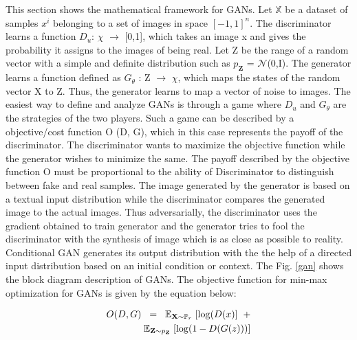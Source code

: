 \documentclass[conference]{IEEEtran}
\begin{document}
	This section shows the mathematical framework for GANs. Let $\mathbb{X}$ be a dataset of samples $x^{i}$ belonging to a set of images in space $[-1,1]^n$. The discriminator learns a function $D_u$: $\chi$ $\rightarrow$ [0,1], which takes an image x and gives the probability it assigns to the images of being real. Let Z be the range of a random vector with a simple and definite distribution such as $p_\textbf{Z}$ = $\mathcal{N}$(0,I). The generator learns a function defined as $G_\theta$ : Z $\rightarrow$ $\chi$, which maps the states of the random vector X to Z. Thus, the generator learns to map a vector of noise to images. The easiest way to define and analyze GANs is through a game where $D_u$ and $G_\theta$ are the strategies of the two players. Such a game can be described by a objective/cost function O (D, G), which in this case represents the payoff of the discriminator. The discriminator wants to maximize the objective function while the generator wishes to minimize the same. The payoff described by the objective function O must be proportional to the ability of Discriminator to distinguish between fake and real samples. The image generated by the generator is based on a textual input distribution while the discriminator compares the generated image to the actual images. Thus adversarially, the discriminator uses the gradient obtained to train generator and the generator tries to fool the discriminator with the synthesis of image which is as close as possible to reality. Conditional GAN generates its output distribution with the the help of a directed input distribution based on an initial condition or context. The Fig. \ref{gan} shows the block diagram description of GANs. The objective function for min-max optimization for GANs is given by the equation below:
	
	\begin{equation}
	\begin{split}
	O(D,G) \hspace{0.2cm} = \hspace{0.2cm} \mathbb{E}_{\textbf{X}\sim\mathbb{P}_{r}}\hspace{0.1cm}[\log(D(x)]\hspace{0.2cm}+\\ \hspace{0.2cm} \mathbb{E}_{\textbf{\textbf{Z}}\sim p_{\textbf{Z}}}\hspace{0.1cm}[\log(1-D(G(z)))]      
	\end{split}
	\end{equation}
	
\end{document}
